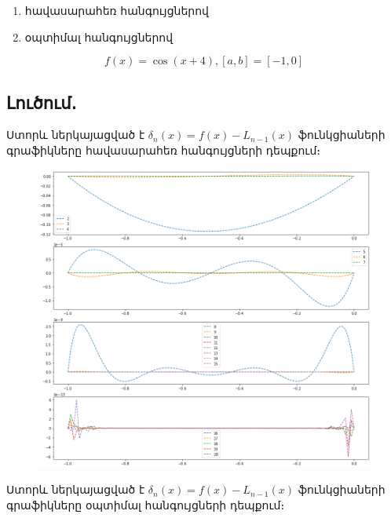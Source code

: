 \documentclass{article}
\begin{document}
 \begin{enumerate}

\item հավասարահեռ հանգույցներով
\item օպտիմալ հանգույցներով
\end{enumerate}



$$f\left(x\right) = \cos\left(x+4\right), \left[a, b\right] = \left[-1 ,0\right]$$

\subsection*{Լուծում․}

Ստորև ներկայացված է $\delta_{n} \left(x\right) = f\left(x\right) - L_{n-1}\left(x\right)$ ֆունկցիաների գրաֆիկները հավասարահեռ հանգույցների դեպքում։

\begin{figure}[h]
   \includegraphics[width=\textwidth]{lagrange_equilateral_nodes}
\end{figure}

\newpage

Ստորև ներկայացված է $\delta_{n} \left(x\right) = f\left(x\right) - L_{n-1}\left(x\right)$ ֆունկցիաների գրաֆիկները օպտիմալ հանգույցների դեպքում։
\end{document}
